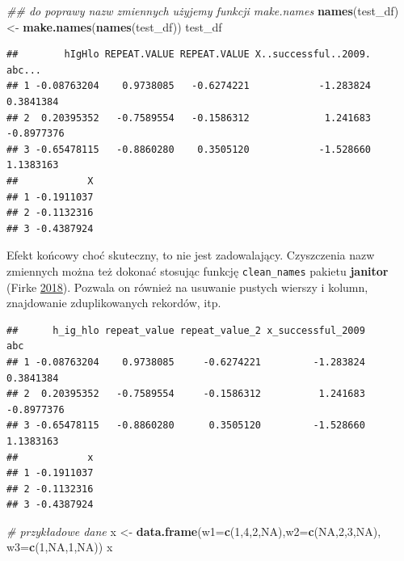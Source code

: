 \documentclass[
]{book}
\newenvironment{Shaded}{\begin{snugshade}}{\end{snugshade}}
\newcommand{\CommentTok}[1]{\textcolor[rgb]{0.56,0.35,0.01}{\textit{#1}}}
\newcommand{\DataTypeTok}[1]{\textcolor[rgb]{0.13,0.29,0.53}{#1}}
\newcommand{\DecValTok}[1]{\textcolor[rgb]{0.00,0.00,0.81}{#1}}
\newcommand{\KeywordTok}[1]{\textcolor[rgb]{0.13,0.29,0.53}{\textbf{#1}}}
\newcommand{\NormalTok}[1]{#1}
\newcommand{\OperatorTok}[1]{\textcolor[rgb]{0.81,0.36,0.00}{\textbf{#1}}}
\newcommand{\OtherTok}[1]{\textcolor[rgb]{0.56,0.35,0.01}{#1}}
\newcommand{\StringTok}[1]{\textcolor[rgb]{0.31,0.60,0.02}{#1}}
\theoremstyle{plain}
\theoremstyle{definition}
\theoremstyle{definition}
\theoremstyle{definition}
\theoremstyle{definition}
\theoremstyle{remark}
\begin{document}
\begin{Shaded}
\begin{Highlighting}[]
\CommentTok{## do poprawy nazw zmiennych użyjemy funkcji make.names}
\KeywordTok{names}\NormalTok{(test_df) <-}\StringTok{ }\KeywordTok{make.names}\NormalTok{(}\KeywordTok{names}\NormalTok{(test_df))}
\NormalTok{test_df}
\end{Highlighting}
\end{Shaded}

\begin{verbatim}
##        hIgHlo REPEAT.VALUE REPEAT.VALUE X..successful..2009.     abc...
## 1 -0.08763204    0.9738085   -0.6274221            -1.283824  0.3841384
## 2  0.20395352   -0.7589554   -0.1586312             1.241683 -0.8977376
## 3 -0.65478115   -0.8860280    0.3505120            -1.528660  1.1383163
##            X
## 1 -0.1911037
## 2 -0.1132316
## 3 -0.4387924
\end{verbatim}

Efekt końcowy choć skuteczny, to nie jest zadowalający. Czyszczenia nazw zmiennych można też dokonać stosując funkcję \texttt{clean\_names} pakietu \textbf{janitor} (Firke \protect\hyperlink{ref-R-janitor}{2018}). Pozwala on również na usuwanie pustych wierszy i kolumn, znajdowanie zduplikowanych rekordów, itp.

\begin{Shaded}
\end{Shaded}

\begin{verbatim}
##      h_ig_hlo repeat_value repeat_value_2 x_successful_2009        abc
## 1 -0.08763204    0.9738085     -0.6274221         -1.283824  0.3841384
## 2  0.20395352   -0.7589554     -0.1586312          1.241683 -0.8977376
## 3 -0.65478115   -0.8860280      0.3505120         -1.528660  1.1383163
##            x
## 1 -0.1911037
## 2 -0.1132316
## 3 -0.4387924
\end{verbatim}

\begin{Shaded}
\begin{Highlighting}[]
\CommentTok{# przykładowe dane}
\NormalTok{x <-}\StringTok{ }\KeywordTok{data.frame}\NormalTok{(}\DataTypeTok{w1=}\KeywordTok{c}\NormalTok{(}\DecValTok{1}\NormalTok{,}\DecValTok{4}\NormalTok{,}\DecValTok{2}\NormalTok{,}\OtherTok{NA}\NormalTok{),}\DataTypeTok{w2=}\KeywordTok{c}\NormalTok{(}\OtherTok{NA}\NormalTok{,}\DecValTok{2}\NormalTok{,}\DecValTok{3}\NormalTok{,}\OtherTok{NA}\NormalTok{), }\DataTypeTok{w3=}\KeywordTok{c}\NormalTok{(}\DecValTok{1}\NormalTok{,}\OtherTok{NA}\NormalTok{,}\DecValTok{1}\NormalTok{,}\OtherTok{NA}\NormalTok{))}
\NormalTok{x}
\end{Highlighting}
\end{Shaded}
\end{document}
